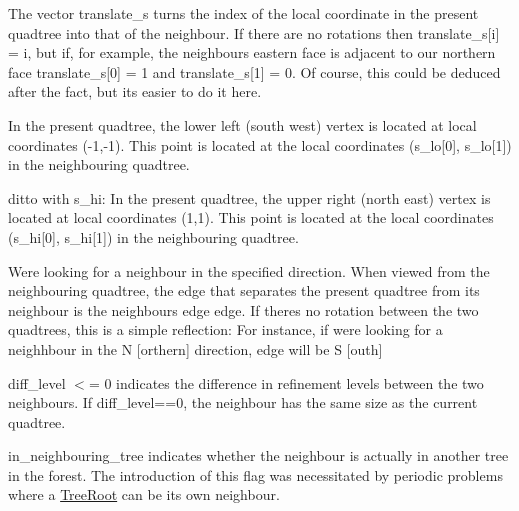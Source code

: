 \begin{DoxyItemize}
\item The vector translate\+\_\+s turns the index of the local coordinate in the present quadtree into that of the neighbour. If there are no rotations then translate\+\_\+s\mbox{[}i\mbox{]} = i, but if, for example, the neighbour\textquotesingle{}s eastern face is adjacent to our northern face translate\+\_\+s\mbox{[}0\mbox{]} = 1 and translate\+\_\+s\mbox{[}1\mbox{]} = 0. Of course, this could be deduced after the fact, but it\textquotesingle{}s easier to do it here.
\item In the present quadtree, the lower left (south west) vertex is located at local coordinates (-\/1,-\/1). This point is located at the local coordinates ({\ttfamily s\+\_\+lo}\mbox{[}0\mbox{]}, {\ttfamily s\+\_\+lo}\mbox{[}1\mbox{]}) in the neighbouring quadtree.
\item ditto with s\+\_\+hi\+: In the present quadtree, the upper right (north east) vertex is located at local coordinates (1,1). This point is located at the local coordinates ({\ttfamily s\+\_\+hi}\mbox{[}0\mbox{]}, {\ttfamily s\+\_\+hi}\mbox{[}1\mbox{]}) in the neighbouring quadtree.
\item We\textquotesingle{}re looking for a neighbour in the specified {\ttfamily direction}. When viewed from the neighbouring quadtree, the edge that separates the present quadtree from its neighbour is the neighbour\textquotesingle{}s {\ttfamily edge} edge. If there\textquotesingle{}s no rotation between the two quadtrees, this is a simple reflection\+: For instance, if we\textquotesingle{}re looking for a neighhbour in the {\ttfamily N} \mbox{[}orthern\mbox{]} {\ttfamily direction}, {\ttfamily edge} will be {\ttfamily S} \mbox{[}outh\mbox{]}
\item {\ttfamily diff\+\_\+level} $<$= 0 indicates the difference in refinement levels between the two neighbours. If {\ttfamily diff\+\_\+level==0}, the neighbour has the same size as the current quadtree.
\item {\ttfamily in\+\_\+neighbouring\+\_\+tree} indicates whether the neighbour is actually in another tree in the forest. The introduction of this flag was necessitated by periodic problems where a \hyperlink{classoomph_1_1TreeRoot}{Tree\+Root} can be its own neighbour.
\end{DoxyItemize}

